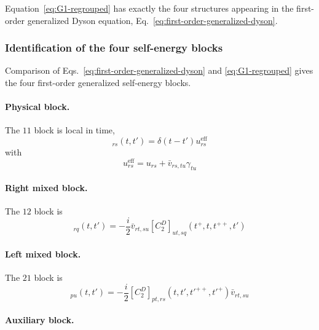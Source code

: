 \documentclass[aip,jcp,reprint,noshowkeys,superscriptaddress]{revtex4-1}
\begin{document}
Equation~\eqref{eq:G1-regrouped} has exactly the four structures
appearing in the first-order generalized Dyson equation,
Eq.~\eqref{eq:first-order-generalized-dyson}.


\subsubsection{Identification of the four self-energy blocks}

Comparison of Eqs.~\eqref{eq:first-order-generalized-dyson} and
\eqref{eq:G1-regrouped} gives the four first-order generalized
self-energy blocks.

\paragraph{Physical block.}

The $11$ block is local in time,
\begin{equation}
  [\Sigma_1^{11}]_{rs}(t,t')
  =
  \delta(t-t')
  u^{\mathrm{eff}}_{rs}
  \label{eq:sigma11-first}
\end{equation}
with
\begin{equation}
  u^{\mathrm{eff}}_{rs}
  =
  u_{rs}
  +
  \bar v_{rs,tu}\gamma_{tu}
\end{equation}


\paragraph{Right mixed block.}

The $12$ block is
\begin{equation}
  [\Sigma_1^{12}]_{rq}(t,t')
  =
  -\frac{i}{2}
  \bar v_{rt,su}
  [C_2^D]_{ut,sq}
  (t^+,t,t^{++},t')
  \label{eq:sigma12-first}
\end{equation}


\paragraph{Left mixed block.}

The $21$ block is
\begin{equation}
  [\Sigma_1^{21}]_{pu}(t,t')
  =
  -\frac{i}{2}
  [C_2^D]_{pt,rs}
  (t,t',t'^{++},t'^+)
  \bar v_{rt,su}
  \label{eq:sigma21-first}
\end{equation}


\paragraph{Auxiliary block.}
\end{document}
